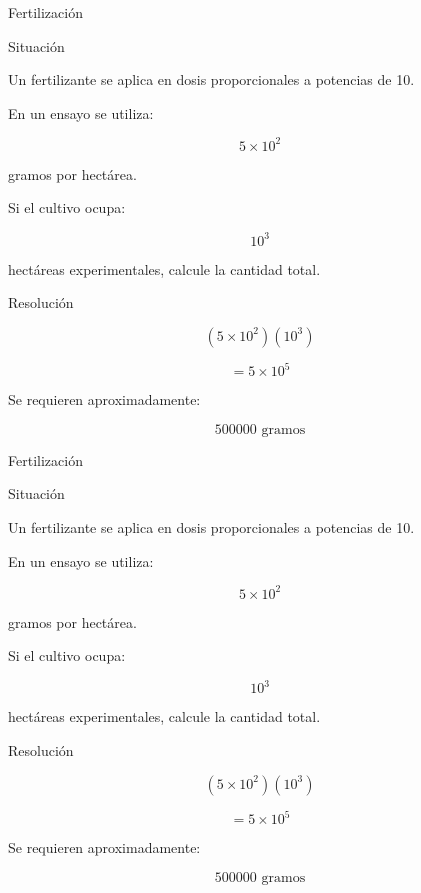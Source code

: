 \documentclass[aspectratio=169,10pt,handout]{beamer}
\begin{document}
	\begin{frame}{Fertilización}
		
		\begin{block}{Situación}
			
			Un fertilizante se aplica en dosis proporcionales a potencias de 10.
			
			En un ensayo se utiliza:
			
			\[
			5\times10^2
			\]
			
			gramos por hectárea.
			
			Si el cultivo ocupa:
			
			\[
			10^3
			\]
			
			hectáreas experimentales, calcule la cantidad total.
			
		\end{block}
		
		\pause
		
		\begin{exampleblock}{Resolución}
			
			\[
			(5\times10^2)(10^3)
			\]
			
			\[
			=5\times10^{5}
			\]
			
			Se requieren aproximadamente:
			
			\[
			500000\text{ gramos}
			\]
			
		\end{exampleblock}
		
	\end{frame}
	\begin{frame}{Fertilización}
		
		\begin{block}{Situación}
			
			Un fertilizante se aplica en dosis proporcionales a potencias de 10.
			
			En un ensayo se utiliza:
			
			\[
			5\times10^2
			\]
			
			gramos por hectárea.
			
			Si el cultivo ocupa:
			
			\[
			10^3
			\]
			
			hectáreas experimentales, calcule la cantidad total.
			
		\end{block}
		
		\pause
		
		\begin{exampleblock}{Resolución}
			
			\[
			(5\times10^2)(10^3)
			\]
			
			\[
			=5\times10^{5}
			\]
			
			Se requieren aproximadamente:
			
			\[
			500000\text{ gramos}
			\]
			
		\end{exampleblock}
		
	\end{frame}
	
\end{document}
